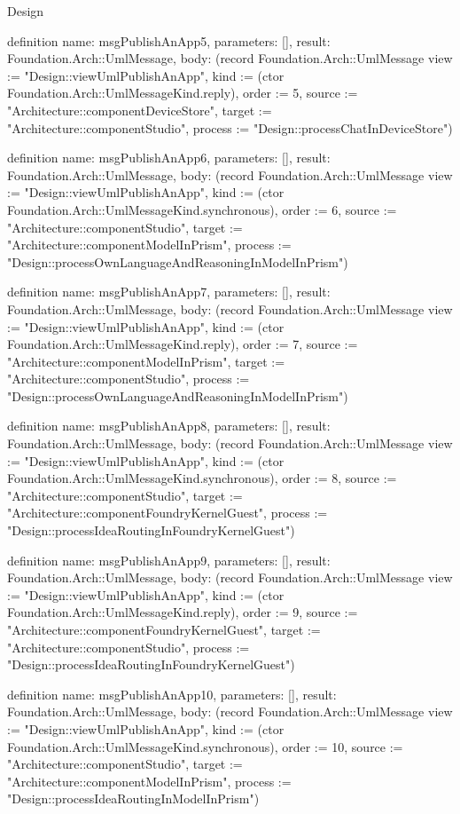 \begin{lexlean}{Design}
\begin{semanticmodule}
definition{
  name: msgPublishAnApp5,
  parameters: [],
  result: Foundation.Arch::UmlMessage,
  body: (record Foundation.Arch::UmlMessage {view := "Design::viewUmlPublishAnApp", kind := (ctor Foundation.Arch::UmlMessageKind.reply), order := 5, source := "Architecture::componentDeviceStore", target := "Architecture::componentStudio", process := "Design::processChatInDeviceStore"})
}

definition{
  name: msgPublishAnApp6,
  parameters: [],
  result: Foundation.Arch::UmlMessage,
  body: (record Foundation.Arch::UmlMessage {view := "Design::viewUmlPublishAnApp", kind := (ctor Foundation.Arch::UmlMessageKind.synchronous), order := 6, source := "Architecture::componentStudio", target := "Architecture::componentModelInPrism", process := "Design::processOwnLanguageAndReasoningInModelInPrism"})
}

definition{
  name: msgPublishAnApp7,
  parameters: [],
  result: Foundation.Arch::UmlMessage,
  body: (record Foundation.Arch::UmlMessage {view := "Design::viewUmlPublishAnApp", kind := (ctor Foundation.Arch::UmlMessageKind.reply), order := 7, source := "Architecture::componentModelInPrism", target := "Architecture::componentStudio", process := "Design::processOwnLanguageAndReasoningInModelInPrism"})
}

definition{
  name: msgPublishAnApp8,
  parameters: [],
  result: Foundation.Arch::UmlMessage,
  body: (record Foundation.Arch::UmlMessage {view := "Design::viewUmlPublishAnApp", kind := (ctor Foundation.Arch::UmlMessageKind.synchronous), order := 8, source := "Architecture::componentStudio", target := "Architecture::componentFoundryKernelGuest", process := "Design::processIdeaRoutingInFoundryKernelGuest"})
}

definition{
  name: msgPublishAnApp9,
  parameters: [],
  result: Foundation.Arch::UmlMessage,
  body: (record Foundation.Arch::UmlMessage {view := "Design::viewUmlPublishAnApp", kind := (ctor Foundation.Arch::UmlMessageKind.reply), order := 9, source := "Architecture::componentFoundryKernelGuest", target := "Architecture::componentStudio", process := "Design::processIdeaRoutingInFoundryKernelGuest"})
}

definition{
  name: msgPublishAnApp10,
  parameters: [],
  result: Foundation.Arch::UmlMessage,
  body: (record Foundation.Arch::UmlMessage {view := "Design::viewUmlPublishAnApp", kind := (ctor Foundation.Arch::UmlMessageKind.synchronous), order := 10, source := "Architecture::componentStudio", target := "Architecture::componentModelInPrism", process := "Design::processIdeaRoutingInModelInPrism"})
}


\end{semanticmodule}
\end{lexlean}
